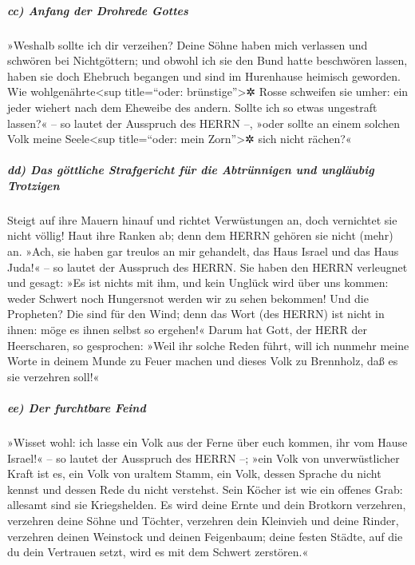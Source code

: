 \hypertarget{cc-anfang-der-drohrede-gottes}{%
\subparagraph{cc) Anfang der Drohrede
Gottes}\label{cc-anfang-der-drohrede-gottes}}

»Weshalb sollte ich dir verzeihen? Deine Söhne haben mich
verlassen und schwören bei Nichtgöttern; und obwohl ich sie den Bund
hatte beschwören lassen, haben sie doch Ehebruch begangen und sind im
Hurenhause heimisch geworden. Wie
wohlgenährte\textless sup title=``oder: brünstige''\textgreater✲ Rosse
schweifen sie umher: ein jeder wiehert nach dem Eheweibe des andern.
Sollte ich so etwas ungestraft lassen?« -- so lautet der
Ausspruch des HERRN --, »oder sollte an einem solchen Volk meine
Seele\textless sup title=``oder: mein Zorn''\textgreater✲ sich nicht
rächen?«

\hypertarget{dd-das-guxf6ttliche-strafgericht-fuxfcr-die-abtruxfcnnigen-und-ungluxe4ubig-trotzigen}{%
\subparagraph{dd) Das göttliche Strafgericht für die Abtrünnigen und
ungläubig
Trotzigen}\label{dd-das-guxf6ttliche-strafgericht-fuxfcr-die-abtruxfcnnigen-und-ungluxe4ubig-trotzigen}}

Steigt auf ihre Mauern hinauf und richtet Verwüstungen
an, doch vernichtet sie nicht völlig! Haut ihre Ranken ab; denn dem
HERRN gehören sie nicht (mehr) an. »Ach, sie haben gar
treulos an mir gehandelt, das Haus Israel und das Haus Juda!« -- so
lautet der Ausspruch des HERRN. Sie haben den HERRN
verleugnet und gesagt: »Es ist nichts mit ihm, und kein Unglück wird
über uns kommen: weder Schwert noch Hungersnot werden wir zu sehen
bekommen! Und die Propheten? Die sind für den Wind; denn
das Wort (des HERRN) ist nicht in ihnen: möge es ihnen selbst so
ergehen!« Darum hat Gott, der HERR der Heerscharen, so
gesprochen: »Weil ihr solche Reden führt, will ich nunmehr meine Worte
in deinem Munde zu Feuer machen und dieses Volk zu Brennholz, daß es sie
verzehren soll!«

\hypertarget{ee-der-furchtbare-feind}{%
\subparagraph{ee) Der furchtbare Feind}\label{ee-der-furchtbare-feind}}

»Wisset wohl: ich lasse ein Volk aus der Ferne über euch
kommen, ihr vom Hause Israel!« -- so lautet der Ausspruch des HERRN --;
»ein Volk von unverwüstlicher Kraft ist es, ein Volk von uraltem Stamm,
ein Volk, dessen Sprache du nicht kennst und dessen Rede du nicht
verstehst. Sein Köcher ist wie ein offenes Grab: allesamt
sind sie Kriegshelden. Es wird deine Ernte und dein
Brotkorn verzehren, verzehren deine Söhne und Töchter, verzehren dein
Kleinvieh und deine Rinder, verzehren deinen Weinstock und deinen
Feigenbaum; deine festen Städte, auf die du dein Vertrauen setzt, wird
es mit dem Schwert zerstören.«

